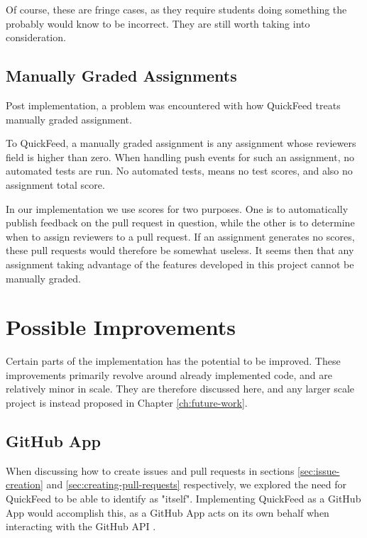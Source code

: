 Of course, these are fringe cases, as they require students doing something the probably would know to be incorrect.
They are still worth taking into consideration.

\subsection{Manually Graded Assignments}

Post implementation, a problem was encountered with how QuickFeed treats manually graded assignment.

To QuickFeed, a manually graded assignment is any assignment whose reviewers field is higher than zero.
When handling push events for such an assignment, no automated tests are run.
No automated tests, means no test scores, and also no assignment total score.

In our implementation we use scores for two purposes.
One is to automatically publish feedback on the pull request in question, while the other is to determine when to assign reviewers to a pull request.
If an assignment generates no scores, these pull requests would therefore be somewhat useless.
It seems then that any assignment taking advantage of the features developed in this project cannot be manually graded.

\section{Possible Improvements}

Certain parts of the implementation has the potential to be improved.
These improvements primarily revolve around already implemented code, and are relatively minor in scale.
They are therefore discussed here, and any larger scale project is instead proposed in Chapter \ref{ch:future-work}.

\subsection{GitHub App}
\label{section:github-app}

When discussing how to create issues and pull requests in sections \ref{sec:issue-creation} and \ref{sec:creating-pull-requests} respectively, we explored the need for QuickFeed to be able to identify as "itself".
Implementing QuickFeed as a GitHub App would accomplish this, as a GitHub App acts on its own behalf when interacting with the GitHub API \cite{apps}.

